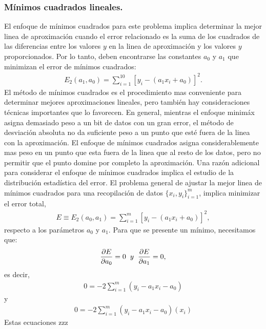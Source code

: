 \subsubsection{Mínimos cuadrados lineales.}
  El enfoque de mínimos cuadrados para este problema implica determinar la mejor linea de aproximación cuando el error relacionado es la suma de los cuadrados de las diferencias entre los valores $y$ en la linea de aproximación y los valores $y$ proporcionados. Por lo tanto, deben encontrarse las constantes $a_0$ y $a_1$ que minimizan el error de mínimos cuadrados:
  \begin{align*}
    E_2(a_1,a_0)=\sum_{i=1}^{10}[y_i-(a_1x_i+a_0)]^2.
  \end{align*}
  El método de mínimos cuadrados es el procedimiento mas conveniente para determinar mejores aproximaciones lineales, pero también hay consideraciones técnicas importantes que lo favorecen. En general, mientras el enfoque minimáx asigna demasiado peso a un bit de datos con un gran error, el método de desviación absoluta no da suficiente peso a un punto que esté fuera de la linea con la aproximación. El enfoque de mínimos cuadrados asigna considerablemente mas peso en un punto que esta fuera de la linea que al resto de los datos, pero no permitir que el punto domine por completo la aproximación. Una razón adicional para considerar el enfoque de mínimos cuadrados implica el estudio de la distribución estadística del error. 
  El problema general de ajustar la mejor linea de mínimos cuadrados para una recopilación de datos $\{x_i,y_i\}_{i=1}^{m}$, implica minimizar el error total,
  \begin{align*}
    E\equiv E_{2}(a_0,a_1)=\sum_{i=1}^{m}[y_i-(a_1x_i+a_0)]^{2},
  \end{align*}
  respecto a los parámetros $a_0$ y $a_1$. Para que se presente un mínimo, necesitamos que:
  \begin{align*}
    \frac{\partial E}{\partial a_0}=0\hspace{0.2cm}y\hspace{0.2cm}\frac{\partial E}{\partial a_1}=0,
  \end{align*}
  es decir,
  \begin{align*}
    0=-2\sum_{i=1}^{m}(y_i-a_1x_i-a_0)
  \end{align*}
  y
  \begin{align*}
    0=-2\sum_{i=1}^{m}(y_i-a_1x_i-a_0)(x_i)
  \end{align*}
  Estas ecuaciones zzz
